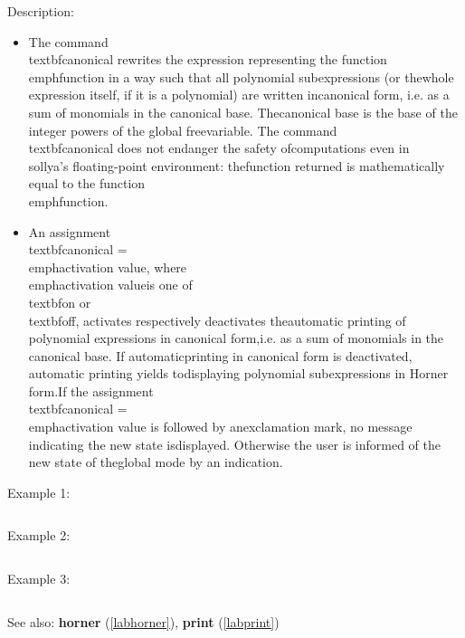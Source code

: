 \noindent Description: \begin{itemize}

\item The command \\textbf{canonical} rewrites the expression representing the function\n   \\emph{function} in a way such that all polynomial subexpressions (or the\n   whole expression itself, if it is a polynomial) are written in\n   canonical form, i.e. as a sum of monomials in the canonical base. The\n   canonical base is the base of the integer powers of the global free\n   variable. The command \\textbf{canonical} does not endanger the safety of\n   computations even in \\sollya's floating-point environment: the\n   function returned is mathematically equal to the function \\emph{function}.\n
\item An assignment \\textbf{canonical} = \\emph{activation value}, where \\emph{activation value}\n   is one of \\textbf{on} or \\textbf{off}, activates respectively deactivates the\n   automatic printing of polynomial expressions in canonical form,\n   i.e. as a sum of monomials in the canonical base. If automatic\n   printing in canonical form is deactivated, automatic printing yields to\n   displaying polynomial subexpressions in Horner form.\n    \n   If the assignment \\textbf{canonical} = \\emph{activation value} is followed by an\n   exclamation mark, no message indicating the new state is\n   displayed. Otherwise the user is informed of the new state of the\n   global mode by an indication.\n\end{itemize}
\noindent Example 1: 
\begin{center}\begin{minipage}{15cm}\begin{Verbatim}[frame=single]
\end{Verbatim}
\end{minipage}\end{center}
\noindent Example 2: 
\begin{center}\begin{minipage}{15cm}\begin{Verbatim}[frame=single]
\end{Verbatim}
\end{minipage}\end{center}
\noindent Example 3: 
\begin{center}\begin{minipage}{15cm}\begin{Verbatim}[frame=single]
\end{Verbatim}
\end{minipage}\end{center}
See also: \textbf{horner} (\ref{labhorner}), \textbf{print} (\ref{labprint})
